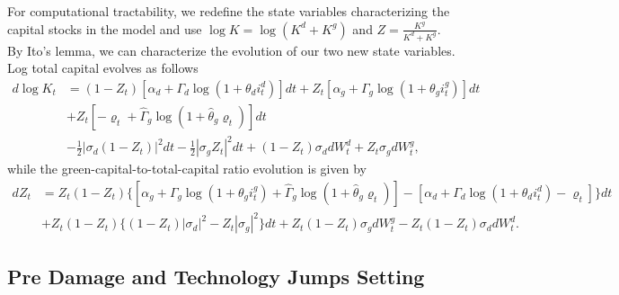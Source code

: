 \documentclass[12pt]{article}
\begin{document}
\begin{appendices}
For computational tractability, we redefine the state variables characterizing the capital stocks in the model and use $\log K=\log(K^{d}+K^{g})$ and $Z=\frac{K^{g}}{K^{d}+K^{g}}$. By Ito's lemma, we can characterize the evolution of our two new state variables. Log total capital evolves as follows
\begin{align*}
d\log K_t & =(1-Z_t)[\alpha_{d}+\Gamma_d \log(1+ \theta_d i^d_{t})]dt+Z_t[\alpha_{g}+\Gamma_g \log(1+ \theta_g i^g_{t})]dt\\
&  + Z_t [ - \varrho_t  + \hat{\Gamma}_g \log(1+ \hat{\theta}_g \varrho_{t})]dt \\
 & -\frac{1}{2}|\sigma_{d}(1-Z_t)|^{2}dt-\frac{1}{2}|\sigma_{g}Z_t|^{2}dt+(1-Z_t)\sigma_{d}dW^{d}_t+Z_t\sigma_{g}dW^{g}_t,
\end{align*}
while the green-capital-to-total-capital ratio evolution is given by
\begin{align*} 
dZ_t & = Z_t(1-Z_t)\{[\alpha_{g}+\Gamma_g \log(1+ \theta_g i^g_{t}) +\hat{\Gamma}_g \log(1+ \hat{\theta}_g \varrho_{t})] - [\alpha_{d}+\Gamma_d \log(1+ \theta_d i^d_{t}) - \varrho_{t}]\}dt\\
 & + Z_t(1-Z_t)\{(1-Z_t)|\sigma_{d}|^{2}-Z_t|\sigma_{g}|^{2}\}dt +Z_t(1-Z_t)\sigma_{g}dW^{g}_t-Z_t(1-Z_t)\sigma_{d}dW^{d}_t.
\end{align*}



\subsection{Pre Damage and Technology Jumps Setting}


\end{appendices}
\end{document}
